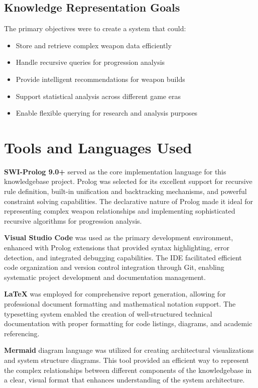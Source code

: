 \documentclass[12pt,a4paper]{article}
\begin{document}
\subsection{Knowledge Representation Goals}

The primary objectives were to create a system that could:

\begin{itemize}
    \item Store and retrieve complex weapon data efficiently
    \item Handle recursive queries for progression analysis
    \item Provide intelligent recommendations for weapon builds
    \item Support statistical analysis across different game eras
    \item Enable flexible querying for research and analysis purposes
\end{itemize}

\section{Tools and Languages Used}

\textbf{SWI-Prolog 9.0+\@} served as the core implementation language for this knowledgebase project. Prolog was selected for its excellent support for recursive rule definition, built-in unification and backtracking mechanisms, and powerful constraint solving capabilities. The declarative nature of Prolog made it ideal for representing complex weapon relationships and implementing sophisticated recursive algorithms for progression analysis.

\textbf{Visual Studio Code} was used as the primary development environment, enhanced with Prolog extensions that provided syntax highlighting, error detection, and integrated debugging capabilities. The IDE facilitated efficient code organization and version control integration through Git, enabling systematic project development and documentation management.

\textbf{LaTeX\@} was employed for comprehensive report generation, allowing for professional document formatting and mathematical notation support. The typesetting system enabled the creation of well-structured technical documentation with proper formatting for code listings, diagrams, and academic referencing.

\textbf{Mermaid} diagram language was utilized for creating architectural visualizations and system structure diagrams. This tool provided an efficient way to represent the complex relationships between different components of the knowledgebase in a clear, visual format that enhances understanding of the system architecture.
\end{document}
